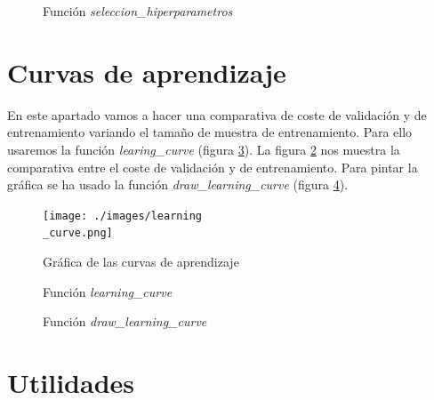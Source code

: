 \documentclass[6pt]{AiTex}
\begin{document}
\begin{figure}[H]
    \centering
    
    \caption{Función \textit{seleccion\_hiperparametros}}
    \label{fig:seleccion_hiperparametros}
\end{figure}


\section{Curvas de aprendizaje}

En este apartado vamos a hacer una comparativa de coste de validación y de entrenamiento variando el tamaño de muestra de entrenamiento. Para ello usaremos la función \textit{learing\_curve} (figura \ref{fig:learning_curve}). La figura \ref{fig:curvas_aprendizaje_plot} nos muestra la comparativa entre el coste de validación y de entrenamiento. Para pintar la gráfica se ha usado la función \textit{draw\_learning\_curve} (figura \ref{fig:draw_learning_curve}).

\begin{figure}[H]
    \centering
    \texttt{[image: ./images/learning\\\_curve.png]}
    \caption{Gráfica de las curvas de aprendizaje}
    \label{fig:curvas_aprendizaje_plot}
\end{figure}

\begin{figure}[H]
    \centering
    
    \caption{Función \textit{learning\_curve}}
    \label{fig:learning_curve}
\end{figure}

\begin{figure}[H]
    \centering
    
    \caption{Función \textit{draw\_learning\_curve}}
    \label{fig:draw_learning_curve}
\end{figure}


\section{Utilidades}
\end{document}
